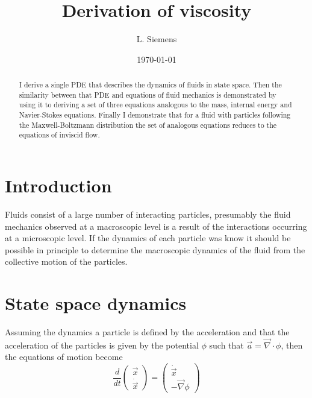 \documentclass[%
preprint,
 amsmath,amssymb,
 aps,
]{revtex4-1}
\newcommand{\dvec}[1]{\dot{\vec{#1}}}
\newcommand{\grad}{\vec{\nabla}}
\begin{document}
\title{Derivation of viscosity}%

\author{L. Siemens}

\date{\today}

\begin{abstract}
I derive a single PDE that describes the dynamics of fluids in state space. Then the similarity between that PDE and equations of fluid mechanics is demonstrated by using it to deriving a set of three equations analogous to the mass, internal energy and Navier-Stokes equations.  Finally I demonstrate that for a fluid with particles following the Maxwell-Boltzmann distribution the set of analogous equations reduces to the equations of inviscid flow.
\end{abstract}

\maketitle

\section{Introduction}

Fluids consist of a large number of interacting particles, presumably the fluid mechanics observed at a macroscopic level is a result of the interactions occurring at a microscopic level. If the dynamics of each particle was know it should be possible in principle to determine the macroscopic dynamics of the fluid from the collective motion of the particles. 

\section{State space dynamics}

Assuming the dynamics a particle is defined by the acceleration and that the acceleration of the particles is given by the potential $\phi$ such that $\vec{a} = \vec{\nabla}\cdot\phi$, then the equations of motion become
\[
\frac{d}{dt}\begin{pmatrix} \vec{x} \\ \dvec{x} \end{pmatrix}=\begin{pmatrix} \dvec{x} \\ -\grad\phi \end{pmatrix}
\]
\end{document}
